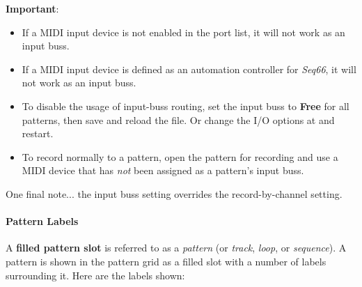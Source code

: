    \textbf{Important}:
   \begin{itemize}
      \item If a MIDI input device is not enabled in the port list,
         it will not work as an input buss.
      \item If a MIDI input device is defined as an automation controller for
         \textsl{Seq66}, it will not work as an input buss.
      \item To disable the usage of input-buss routing, set the input buss
         to \textbf{Free} for all patterns, then save and reload the file.
         Or change the I/O options at
          and
         restart.
      \item To record normally to a pattern, open the pattern for recording
         and use a MIDI device that has \textsl{not} been assigned as
         a pattern's input buss.
   \end{itemize}

   One final note... the input buss setting overrides the record-by-channel
   setting.

\paragraph{Pattern Labels}
\label{paragraph:patterns_labels}
   
   A \textbf{filled pattern slot} is referred to as a \textsl{pattern}
   (or \textsl{track}, \textsl{loop}, or \textsl{sequence}).
   A pattern is shown in the pattern grid as a filled slot with a number of
   labels surrounding it.  Here are the labels shown:

